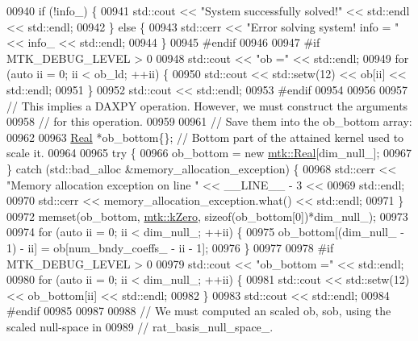 \begin{DoxyCode}
{{00940     \textcolor{keywordflow}{if} (!info\_) \{
00941       std::cout << \textcolor{stringliteral}{"System successfully solved!"} << std::endl << std::endl;
00942     \} \textcolor{keywordflow}{else} \{
00943       std::cerr << \textcolor{stringliteral}{"Error solving system! info = "} << info\_ << std::endl;
00944     \}
00945 \textcolor{preprocessor}{    #endif}
00946 
00947 \textcolor{preprocessor}{    #if MTK\_DEBUG\_LEVEL > 0}
00948     std::cout << \textcolor{stringliteral}{"ob ="} << std::endl;
00949     \textcolor{keywordflow}{for} (\textcolor{keyword}{auto} ii = 0; ii < ob\_ld; ++ii) \{
00950       std::cout << std::setw(12) << ob[ii] << std::endl;
00951     \}
00952     std::cout << std::endl;
00953 \textcolor{preprocessor}{    #endif}
00954 
00956 
00957     \textcolor{comment}{// This implies a DAXPY operation. However, we must construct the arguments}
00958     \textcolor{comment}{// for this operation.}
00959 
00961     \textcolor{comment}{// Save them into the ob\_bottom array:}
00962 
00963     \hyperlink{group__c01-roots_gac080bbbf5cbb5502c9f00405f894857d}{Real} *ob\_bottom\{\}; \textcolor{comment}{// Bottom part of the attained kernel used to scale it.}
00964 
00965     \textcolor{keywordflow}{try} \{
00966       ob\_bottom = \textcolor{keyword}{new} \hyperlink{group__c01-roots_gac080bbbf5cbb5502c9f00405f894857d}{mtk::Real}[dim\_null\_];
00967     \} \textcolor{keywordflow}{catch} (std::bad\_alloc &memory\_allocation\_exception) \{
00968       std::cerr << \textcolor{stringliteral}{"Memory allocation exception on line "} << \_\_LINE\_\_ - 3 <<
00969         std::endl;
00970       std::cerr << memory\_allocation\_exception.what() << std::endl;
00971     \}
00972     memset(ob\_bottom, \hyperlink{group__c01-roots_ga59a451a5fae30d59649bcda274fea271}{mtk::kZero}, \textcolor{keyword}{sizeof}(ob\_bottom[0])*dim\_null\_);
00973 
00974     \textcolor{keywordflow}{for} (\textcolor{keyword}{auto} ii = 0; ii < dim\_null\_; ++ii) \{
00975       ob\_bottom[(dim\_null\_ - 1) - ii] = ob[num\_bndy\_coeffs\_ - ii - 1];
00976     \}
00977 
00978 \textcolor{preprocessor}{    #if MTK\_DEBUG\_LEVEL > 0}
00979     std::cout << \textcolor{stringliteral}{"ob\_bottom ="} << std::endl;
00980     \textcolor{keywordflow}{for} (\textcolor{keyword}{auto} ii = 0; ii < dim\_null\_; ++ii) \{
00981       std::cout << std::setw(12) << ob\_bottom[ii] << std::endl;
00982     \}
00983     std::cout << std::endl;
00984 \textcolor{preprocessor}{    #endif}
00985 
00987 
00988     \textcolor{comment}{// We must computed an scaled ob, sob, using the scaled null-space in}
00989     \textcolor{comment}{// rat\_basis\_null\_space\_.}
}}
\end{DoxyCode}
